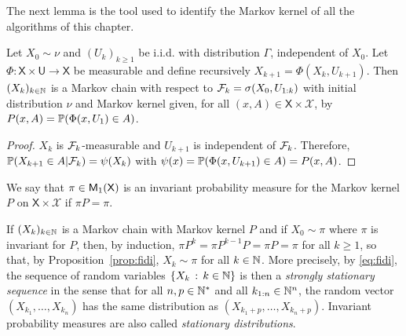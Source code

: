 \documentclass[english,graybox,envcountchap,envcountsame,sectrefs,shortlabels]{svmono}
\theoremstyle{style}
\newcommand{\Xset}{\mathsf{X}}
\newcommand{\Xsigma}{\mathcal{X}}
\newcommand{\Uset}{\mathsf{U}}
\begin{document}
The next lemma is the tool used to identify the Markov kernel of all the algorithms of this chapter.
\begin{lemma}
\label{lem:iterative}
Let $X_0\sim\nu$ and $(U_k)_{k\geq1}$ be i.i.d. with distribution $\Gamma$, independent of $X_0$. Let $\Phi:\Xset\times\Uset\to\Xset$ be measurable and define recursively $X_{k+1} = \Phi(X_k,U_{k+1})$. Then $(X_k)_{k\in\mathbb{N}}$ is a Markov chain with respect to $\mathcal{F}_k = \sigma(X_0,U_{1:k})$ with initial distribution $\nu$ and Markov kernel given, for all $(x,A)\in \Xset\times \Xsigma$, by $P(x,A) = \mathbb{P}(\Phi(x,U_1)\in A)$.
\end{lemma}
\begin{proof}
$X_k$ is $\mathcal{F}_k$-measurable and $U_{k+1}$ is independent of $\mathcal{F}_k$. Therefore,  $\mathbb{P}(X_{k+1}\in A|\mathcal{F}_k) = \psi(X_k)$ with $\psi(x) = \mathbb{P}(\Phi(x,U_{k+1})\in A) = P(x,A)$.
\end{proof}

\begin{definition}
We say that $\pi\in\meas 1(\Xset)$ is an invariant probability measure
for the Markov kernel $P$ on $\Xset\times\Xsigma$ if $\pi P=\pi$.
\end{definition}
If $(X_{k})_{k\in\mathbb{N}}$ is a Markov chain with Markov kernel $P$
and if $X_{0}\sim\pi$ where $\pi$ is invariant for $P$, then, by induction, $\pi P^{k}=\pi P^{k-1}P = \pi P = \pi$ for all $k\geq 1$, so that, by Proposition~\ref{prop:fidi}, $X_{k}\sim\pi$ for all $k\in\mathbb{N}$. More precisely, by \eqref{eq:fidi}, the sequence of random variables
$\left\{ X_{k}\,:\,k\in\mathbb{N}\right\}$ is then a \emph{strongly stationary sequence} in the sense that for all $n,p\in\mathbb{N}^{*}$
and all $k_{1:n}\in\mathbb{N}^n$, the random vector $(X_{k_{1}},\ldots,X_{k_{n}})$
has the same distribution as $(X_{k_{1}+p},\ldots,X_{k_{n}+p})$. Invariant probability measures are also called \emph{stationary distributions}.
\end{document}
